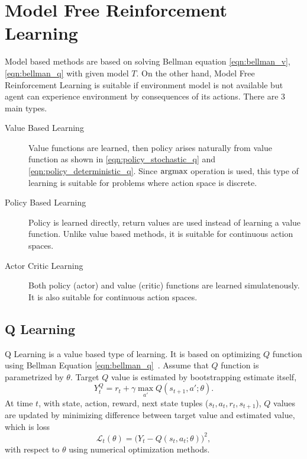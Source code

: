 \section{Model Free Reinforcement Learning}
\label{sec:mf_rl}

Model based methods are based on solving Bellman equation \eqref{eqn:bellman_v}, \eqref{eqn:bellman_q} with given model $T$. 
On the other hand, Model Free Reinforcement Learning is suitable 
if environment model is not available but agent can experience environment by consequences of its actions. There are 3 main types. 

\begin{description}
	\item[Value Based Learning] Value functions are learned, 
	then policy arises naturally from value function as shown in \eqref{eqn:policy_stochastic_q} and \eqref{eqn:policy_deterministic_q}. 
	Since $\operatorname{\textup{argmax}}$ operation is used, this type of learning is suitable for problems where action space is discrete. 
	
	\item[Policy Based Learning] Policy is learned directly, 
	return values are used instead of learning a value function. 
	Unlike value based methods, it is suitable for continuous action spaces. 
	
	\item[Actor Critic Learning] Both policy (actor) and value (critic) functions are learned simulatenously. 
	It is also suitable for continuous action spaces. 
	
\end{description}

\subsection{Q Learning}
Q Learning is a value based type of learning. 
It is based on optimizing $Q$ function using Bellman Equation \eqref{eqn:bellman_q}~\cite{watkins_technical_1992}. 
Assume that $Q$ function is parametrized by $\theta$. 
Target $Q$ value is estimated by bootstrapping estimate itself, 
\begin{equation}
\label{eqn:q_target}
Y_t^Q = r_t + \gamma \max_{a'} Q(s_{t+1},a';\theta).
\end{equation}
At time $t$,  with state, action, reward, next state tuples ($s_t,a_t,r_t,s_{t+1}$), 
$Q$ values are updated by minimizing difference between target value and estimated value, which is loss 
\begin{equation}
\label{eqn:q_loss}
\mathcal{L}_t(\theta) = \big( Y_t - Q(s_t,a_t;\theta) \big) ^ 2, 
\end{equation}
with respect to $\theta$ using numerical optimization methods. 

